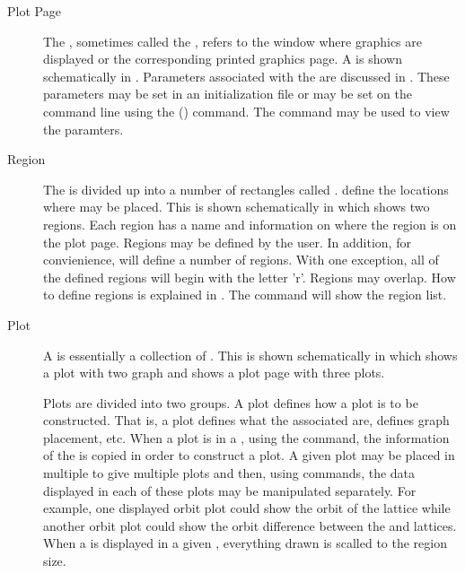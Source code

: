\begin{description}
\item[Plot Page] \Newline
The , sometimes called the , refers to the window where graphics are
displayed or the corresponding printed graphics page. A  is shown schematically in
. Parameters associated with the  are discussed in .
These parameters may be set in an initialization file or may be set on the \tao command line using
the  () command. The  command may
be used to view the paramters.
%
\item[Region] \Newline
The  is divided up into a number of rectangles called . 
define the locations where  may be placed. This is shown schematically in 
which shows two regions. Each region has a name and information on where the region is on the plot
page. Regions may be defined by the user. In addition, for convienience, \tao will define a number
of regions. With one exception, all of the \tao defined regions will begin with the letter
'r'. Regions may overlap. How to define regions is explained in . The  command will show the region list.
%
\item[Plot] \Newline
A  is essentially a collection of . This is shown
schematically in  which shows a plot with two graph and  shows a plot
page with three plots. 

Plots are divided into two groups. A  plot defines how a  plot is to be
constructed. That is, a  plot defines what the associated  are, defines
graph placement, etc. When a  plot is  in a , using the
 command, the information of the  is copied in order to construct a
 plot. A given  plot may be placed in multiple  to give
multiple  plots and then, using  commands, the data displayed in each of these
plots may be manipulated separately. For example, one displayed orbit plot could show the orbit of
the  lattice while another orbit plot could show the orbit difference between the
 and  lattices. When a  is displayed in a given ,
everything drawn is scalled to the region size.


\end{description}
